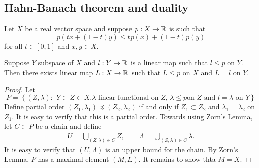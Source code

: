 \documentclass[a4paper]{article}
\begin{document}
\subsection{Hahn-Banach theorem and duality}

\begin{thm}
Let $X$ be a real vector space and suppose $p: X \to \mathbb{R}$
is such that
\[
p(tx + (1-t)y) \leq t p(x) + (1 - t) p (y)
\]
for all $t \in [0,1]$ and $x, y \in X$.

Suppose $Y$ subspace of $X$ and $l: Y \to \mathbb{R}$ is a linear map
such that $l \leq p$ on $Y$. Then there exists linear map $L:
X \to \mathbb{R}$ such that $L \leq p$ on $X$ and $L = l$ on $Y$.
\end{thm}

\begin{proof}

Let
\[
P = \left\{ (Z, \lambda): \text{
  $Y \subset Z \subset X$,
$\lambda$ linear functional on $Z$, $\lambda \leq p$
on $Z$ and $l = \lambda$ on $Y$} \right\}
\]
Define partial order $(Z_1, \lambda_1) \preceq (Z_2, \lambda_2)$
if and only if $Z_1 \subset Z_2$ and $\lambda_1 = \lambda_2$
on $Z_1$. It is easy to verify that this is a partial order.
Towards using Zorn's Lemma, let $C \subset P$ be a chain and
define
\[
\begin{aligned}
  U = \bigcup_{(Z, \lambda) \in C} Z, \qquad
  \Lambda = \bigcup_{(Z, \lambda) \in C} \lambda.
\end{aligned}
\]
It is easy to verify that
$(U, \Lambda)$ is an upper bound for the chain.
By Zorn's Lemma, $P$ has a maximal element $(M, L)$.
It remains to show thta $M = X$.


\end{proof}
\end{document}
